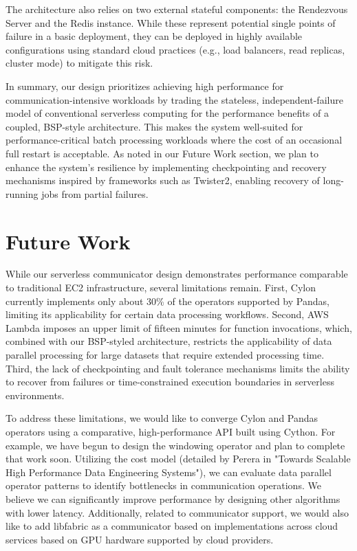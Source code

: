 \documentclass[conference]{IEEEtran}
\begin{document}
The architecture also relies on two external stateful components: the Rendezvous Server and the Redis instance. While these represent potential single points of failure in a basic deployment, they can be deployed in highly available configurations using standard cloud practices (e.g., load balancers, read replicas, cluster mode) to mitigate this risk.

In summary, our design prioritizes achieving high performance for communication-intensive workloads by trading the stateless, independent-failure model of conventional serverless computing for the performance benefits of a coupled, BSP-style architecture. This makes the system well-suited for performance-critical batch processing workloads where the cost of an occasional full restart is acceptable. As noted in our Future Work section, we plan to enhance the system's resilience by implementing checkpointing and recovery mechanisms inspired by frameworks such as Twister2, enabling recovery of long-running jobs from partial failures.

\section{Future Work}
\label{sec:future}

While our serverless communicator design demonstrates performance comparable to traditional EC2 infrastructure, several limitations remain. First, Cylon currently implements only about 30\% of the operators supported by Pandas, limiting its applicability for certain data processing workflows. Second, AWS Lambda imposes an upper limit of fifteen minutes for function invocations, which, combined with our BSP-styled architecture, restricts the applicability of data parallel processing for large datasets that require extended processing time. Third, the lack of checkpointing and fault tolerance mechanisms limits the ability to recover from failures or time-constrained execution boundaries in serverless environments.

To address these limitations, we would like to converge Cylon and Pandas operators using a comparative, high-performance API built using Cython.  For example, we have begun to design the windowing operator and plan to complete that work soon.  Utilizing the cost model (detailed by Perera in "Towards Scalable High Performance Data Engineering Systems"),  we can evaluate data parallel operator patterns to identify bottlenecks in communication operations.  We believe we can significantly improve performance by designing other algorithms with lower latency\cite{perera2023depth}.  Additionally, related to communicator support, we would also like to add libfabric as a communicator based on implementations across cloud services based on GPU hardware supported by cloud providers.
\end{document}
